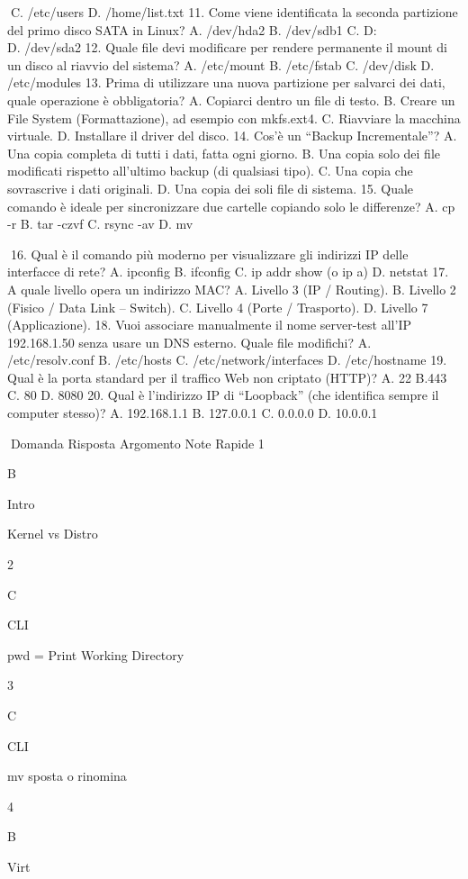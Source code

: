 \documentclass[11pt,a4paper]{article}
\begin{document}
C. /etc/users D. /home/list.txt 11. Come viene identificata la seconda
partizione del primo disco SATA in Linux? A. /dev/hda2 B. /dev/sdb1 C.
D:\\
D. /dev/sda2 12. Quale file devi modificare per rendere permanente il
mount di un disco al riavvio del sistema? A. /etc/mount B. /etc/fstab C.
/dev/disk D. /etc/modules 13. Prima di utilizzare una nuova partizione
per salvarci dei dati, quale operazione è obbligatoria? A. Copiarci
dentro un file di testo. B. Creare un File System (Formattazione), ad
esempio con mkfs.ext4. C. Riavviare la macchina virtuale. D. Installare
il driver del disco. 14. Cos'è un ``Backup Incrementale''? A. Una copia
completa di tutti i dati, fatta ogni giorno. B. Una copia solo dei file
modificati rispetto all'ultimo backup (di qualsiasi tipo). C. Una copia
che sovrascrive i dati originali. D. Una copia dei soli file di sistema.
15. Quale comando è ideale per sincronizzare due cartelle copiando solo
le differenze? A. cp -r B. tar -czvf C. rsync -av D. mv

16. Qual è il comando più moderno per visualizzare gli indirizzi IP
delle interfacce di rete? A. ipconfig B. ifconfig C. ip addr show (o ip
a) D. netstat 17. A quale livello opera un indirizzo MAC? A. Livello 3
(IP / Routing). B. Livello 2 (Fisico / Data Link -- Switch). C. Livello
4 (Porte / Trasporto). D. Livello 7 (Applicazione). 18. Vuoi associare
manualmente il nome server-test all'IP 192.168.1.50 senza usare un DNS
esterno. Quale file modifichi? A. /etc/resolv.conf B. /etc/hosts C.
/etc/network/interfaces D. /etc/hostname 19. Qual è la porta standard
per il traffico Web non criptato (HTTP)? A. 22 B.443 C. 80 D. 8080 20.
Qual è l'indirizzo IP di ``Loopback'' (che identifica sempre il computer
stesso)? A. 192.168.1.1 B. 127.0.0.1 C. 0.0.0.0 D. 10.0.0.1

Domanda Risposta Argomento Note Rapide 1

B

Intro

Kernel vs Distro

2

C

CLI

pwd = Print Working Directory

3

C

CLI

mv sposta o rinomina

4

B

Virt
\end{document}
